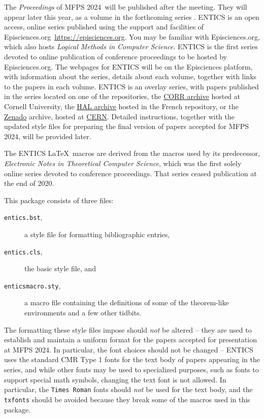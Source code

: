 \documentclass[twoside,11pt]{entics}
\def\conf{MFPS 2024} 	%
\begin{document}
The \emph{Proceedings} of \conf\ will be published after the meeting. They will
appear later this year, as a volume in the forthcoming series \textit{\jour}.
ENTICS is an open access, online series published using the support and
facilities of Episciences.org~\url{https://episciences.org}. You may be
familiar with Episciences.org, which also hosts \emph{Logical Methods in
  Computer Science}. ENTICS is the first series devoted to online publication of
conference proceedings to be hosted by Episciences.org. The webpages for ENTICS
will be on the Episciences platform, with information about the series, details
about each volume, together with links to the papers in each volume. ENTICS is
an overlay series, with papers published in the series located on one of the
repositories, the \href{https://arxiv.org}{CORR archive} hosted at Cornell
University, the \href{https://hal.archives-ouvertes.fr}{HAL archive} hosted in
the French repository, or the \href{https://zenodo.org}{Zenado} archive, hosted
at \href{https://home.cern}{CERN}. Detailed instructions, together with the
updated style files for preparing the final version of papers accepted for
\conf, will be provided later.

The ENTICS \LaTeX\ macros are derived from the macros used by its predecessor,
\emph{Electronic Notes in Theoretical Computer Science}, which was the first
solely online series devoted to conference proceedings. That series ceased
publication at the end of 2020.

This package consists of three files:
\begin{description}
  \item[\texttt{entics.bst},] a style file for formatting bibliographic entries,
  \item[\texttt{entics.cls},] the basic style file, and
  \item[\texttt{enticsmacro.sty},] a macro file containing the
        definitions of some of the theorem-like environments and a few other
        tidbits.
\end{description}
The formatting these style files impose should \emph{not} be altered
-- they are used to establish and maintain a uniform format for the
papers accepted for presentation at \conf. In particular,
the font choices should not be changed -- ENTICS uses the standard CMR Type 1 fonts
for the text body of papers appearing in the series, and while other fonts may be
used to specialized purposes, such as fonts to support special math symbols,
changing the text font is not allowed. In particular, the \texttt{Times Roman} fonts should \emph{not} be used for the text body, and the \texttt{txfonts} should be avoided because they break some of the macros used in this package.
\end{document}
